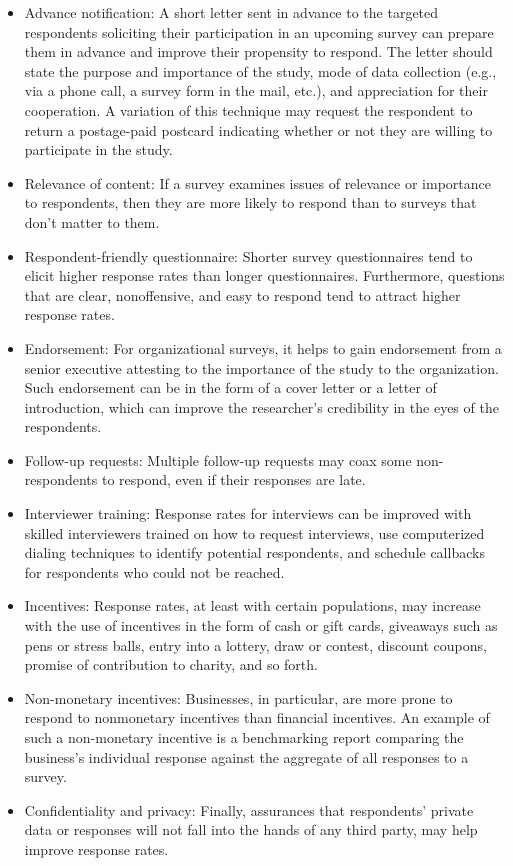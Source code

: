 \begin{itemize}
	\item Advance notification: A short letter sent in advance to the targeted respondents soliciting their participation in an upcoming survey can prepare them in advance and improve their propensity to respond. The letter should state the purpose and importance of the study, mode of data collection (e.g., via a phone call, a survey form in the mail, etc.), and appreciation for their cooperation. A variation of this technique may request the respondent to return a postage-paid postcard indicating whether or not they are willing to participate in the study.
	\item Relevance of content: If a survey examines issues of relevance or importance to respondents, then they are more likely to respond than to surveys that don’t matter to them.
	\item Respondent-friendly questionnaire: Shorter survey questionnaires tend to elicit higher response rates than longer questionnaires. Furthermore, questions that are clear, nonoffensive, and easy to respond tend to attract higher response rates.
	\item Endorsement: For organizational surveys, it helps to gain endorsement from a senior executive attesting to the importance of the study to the organization. Such endorsement can be in the form of a cover letter or a letter of introduction, which can improve the researcher’s credibility in the eyes of the respondents.
	\item Follow-up requests: Multiple follow-up requests may coax some non-respondents to respond, even if their responses are late.
	\item Interviewer training: Response rates for interviews can be improved with skilled interviewers trained on how to request interviews, use computerized dialing techniques to identify potential respondents, and schedule callbacks for respondents who could not be reached.
	\item Incentives: Response rates, at least with certain populations, may increase with the use of incentives in the form of cash or gift cards, giveaways such as pens or stress balls, entry into a lottery, draw or contest, discount coupons, promise of contribution to charity, and so forth.
	\item Non-monetary incentives: Businesses, in particular, are more prone to respond to nonmonetary incentives than financial incentives. An example of such a non-monetary incentive is a benchmarking report comparing the business’s individual response against the aggregate of all responses to a survey.
	\item Confidentiality and privacy: Finally, assurances that respondents’ private data or responses will not fall into the hands of any third party, may help improve response rates.
\end{itemize}

